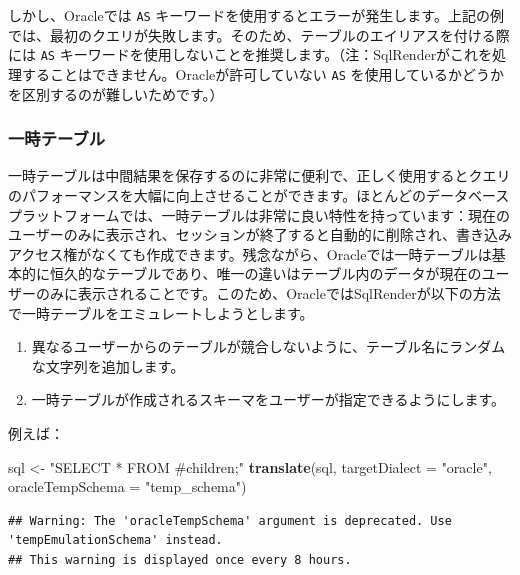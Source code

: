 \documentclass[
  11pt]{book}
\newenvironment{Shaded}{\begin{snugshade}}{\end{snugshade}}
\newcommand{\AttributeTok}[1]{\textcolor[rgb]{0.13,0.29,0.53}{#1}}
\newcommand{\FunctionTok}[1]{\textcolor[rgb]{0.13,0.29,0.53}{\textbf{#1}}}
\newcommand{\NormalTok}[1]{#1}
\newcommand{\OtherTok}[1]{\textcolor[rgb]{0.56,0.35,0.01}{#1}}
\newcommand{\StringTok}[1]{\textcolor[rgb]{0.31,0.60,0.02}{#1}}
\providecommand{\tightlist}{%
  \setlength{\itemsep}{0pt}\setlength{\parskip}{0pt}}
\theoremstyle{definition}
\theoremstyle{definition}
\theoremstyle{definition}
\theoremstyle{definition}
\theoremstyle{remark}
\begin{document}
しかし、Oracleでは \texttt{AS} キーワードを使用するとエラーが発生します。上記の例では、最初のクエリが失敗します。そのため、テーブルのエイリアスを付ける際には \texttt{AS} キーワードを使用しないことを推奨します。（注：SqlRenderがこれを処理することはできません。Oracleが許可していない \texttt{AS} を使用しているかどうかを区別するのが難しいためです。）

\subsubsection*{一時テーブル}\label{ux4e00ux6642ux30c6ux30fcux30d6ux30eb}

一時テーブルは中間結果を保存するのに非常に便利で、正しく使用するとクエリのパフォーマンスを大幅に向上させることができます。ほとんどのデータベースプラットフォームでは、一時テーブルは非常に良い特性を持っています：現在のユーザーのみに表示され、セッションが終了すると自動的に削除され、書き込みアクセス権がなくても作成できます。残念ながら、Oracleでは一時テーブルは基本的に恒久的なテーブルであり、唯一の違いはテーブル内のデータが現在のユーザーのみに表示されることです。このため、OracleではSqlRenderが以下の方法で一時テーブルをエミュレートしようとします。

\begin{enumerate}
\def\labelenumi{\arabic{enumi}.}
\tightlist
\item
  異なるユーザーからのテーブルが競合しないように、テーブル名にランダムな文字列を追加します。
\item
  一時テーブルが作成されるスキーマをユーザーが指定できるようにします。
\end{enumerate}

例えば：

\begin{Shaded}
\begin{Highlighting}[]
\NormalTok{sql }\OtherTok{\textless{}{-}} \StringTok{"SELECT * FROM \#children;"}
\FunctionTok{translate}\NormalTok{(sql, }\AttributeTok{targetDialect =} \StringTok{"oracle"}\NormalTok{, }\AttributeTok{oracleTempSchema =} \StringTok{"temp\_schema"}\NormalTok{)}
\end{Highlighting}
\end{Shaded}

\begin{verbatim}
## Warning: The 'oracleTempSchema' argument is deprecated. Use 'tempEmulationSchema' instead.
## This warning is displayed once every 8 hours.
\end{verbatim}
\end{document}
